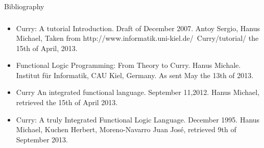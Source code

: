 \documentclass{beamer}
\begin{document}
\begin{section}{Bibliography}
  \begin{frame}
    \frametitle{\secname}
    \begin{itemize}
    \item Curry: A tutorial Introduction. Draft of December 2007. Antoy Sergio, Hanus Michael, Taken from http://www.informatik.uni-kiel.de/~Curry/tutorial/ the 15th of April, 2013.


    \item Functional Logic Programming: From Theory to Curry. Hanus Michale. Institut f\"ur Informatik, CAU Kiel, Germany. As sent May the 13th of 2013.

    \item Curry An integrated functional language. September 11,2012. Hanus Michael, retrieved the 15th of April 2013.

    \item Curry: A truly Integrated Functional Logic Language. December 1995. Hanus Michael, Kuchen Herbert, Moreno-Navarro Juan Jos\'e, retrieved 9th of September 2013.
      
    \end{itemize}

\end{frame}
\end{section}
\end{document}
